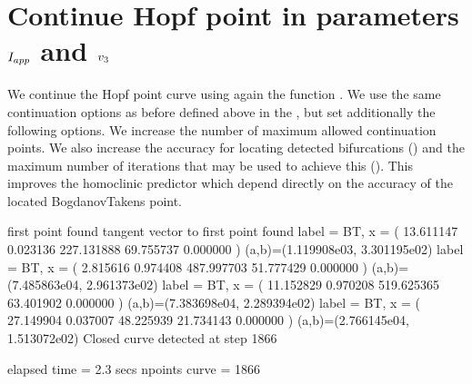 \documentclass[letterpaper,10pt,english]{jupyterBook}
\begin{document}
\section{Continue Hopf point in parameters \protect\(I_{app}\protect\) and \protect\(v_3\protect\)}
\label{\detokenize{Morris-Lecar:continue-hopf-point-in-parameters-i-app-and-v-3}}
\sphinxAtStartPar
We continue the Hopf point curve using again the function . We use the
same continuation options as before defined above in the  , but
set additionally the following options. We increase the number of maximum
allowed continuation points. We also increase the accuracy for locating
detected bifurcations () and the maximum number of iterations
that may be used to achieve this (). This improves the homoclinic
predictor which depend directly on the accuracy of the located Bogdanov\sphinxhyphen{}Takens
point.

\begin{sphinxVerbatim}[commandchars=\\\{\}]
\PYG{p}{[}\PYG{p}{]}
\end{sphinxVerbatim}

\begin{sphinxVerbatim}[commandchars=\\\{\}]
first point found
tangent vector to first point found
label = BT, x = ( 13.611147 0.023136 \PYGZhy{}227.131888 69.755737 0.000000 )
(a,b)=(\PYGZhy{}1.119908e\PYGZhy{}03, \PYGZhy{}3.301195e\PYGZhy{}02)
label = BT, x = ( 2.815616 0.974408 487.997703 \PYGZhy{}51.777429 0.000000 )
(a,b)=(\PYGZhy{}7.485863e\PYGZhy{}04, \PYGZhy{}2.961373e\PYGZhy{}02)
label = BT, x = ( \PYGZhy{}11.152829 0.970208 519.625365 \PYGZhy{}63.401902 0.000000 )
(a,b)=(7.383698e\PYGZhy{}04, 2.289394e\PYGZhy{}02)
label = BT, x = ( \PYGZhy{}27.149904 0.037007 48.225939 21.734143 0.000000 )
(a,b)=(2.766145e\PYGZhy{}04, 1.513072e\PYGZhy{}02)
Closed curve detected at step 1866

elapsed time  = 2.3 secs
npoints curve = 1866
\end{sphinxVerbatim}
\end{document}
